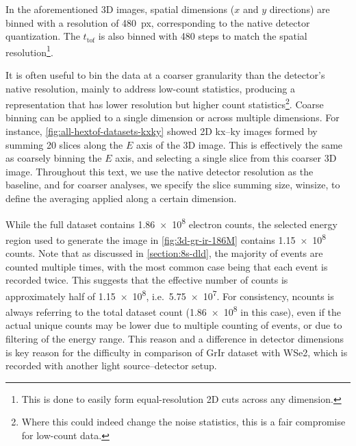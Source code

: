 In the aforementioned 3D images, spatial dimensions ($x$ and $y$ directions) are binned with a resolution of \qty{480}{px}, corresponding to the native detector quantization. The $t_{\text{tof}}$ is also binned with \num{480} steps to match the spatial resolution\footnote{This is done to easily form equal-resolution 2D cuts across any dimension.}. 

It is often useful to bin the data at a coarser granularity than the detector's native resolution, mainly to address low-count statistics, producing a representation that has lower resolution but higher count statistics\footnote{Where this could indeed change the noise statistics, this is a fair compromise for low-count data.}. Coarse binning can be applied to a single dimension or across multiple dimensions. For instance, \cref{fig:all-hextof-datasets-kxky} showed 2D \gls{kx}--\gls{ky} images formed by summing \num{20} slices along the $E$ axis of the 3D image. This is effectively the same as coarsely binning the $E$ axis, and selecting a single slice from this coarser 3D image. Throughout this text, we use the native detector resolution as the baseline, and for coarser analyses, we specify the slice summing size, \gls{winsize}, to define the averaging applied along a certain dimension. 

While the full dataset contains \num{1.86e8} electron counts, the selected energy region used to generate the image in \cref{fig:3d-gr-ir-186M} contains \num{1.15e8} counts. Note that as discussed in \cref{section:8s-dld}, the majority of events are counted multiple times, with the most common case being that each event is recorded twice. This suggests that the effective number of counts is approximately half of \num{1.15e8}, i.e.\ \num{5.75e7}. For consistency, \gls{ncounts} is always referring to the total dataset count (\num{1.86e8} in this case), even if the actual unique counts may be lower due to multiple counting of events, or due to filtering of the energy range. This reason and a difference in detector dimensions is key reason for the difficulty in comparison of \gls{GrIr} dataset with \gls{WSe2}, which is recorded with another light source--detector setup.

